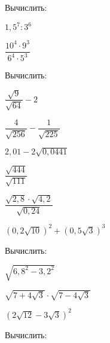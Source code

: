 %
%	
%
%
\begin{class}[number=7]
	\begin{listofex}
		\item Вычислить:
		\begin{enumcols}[itemcolumns=3]
			\item \( 1,5^7:3^6 \)
			\item \( \dfrac{10^4\cdot9^3}{6^4\cdot5^3} \)
			\item {}
		\end{enumcols}
		\item Вычислить:
		\begin{enumcols}[itemcolumns=3]
			\item \( \dfrac{\sqrt{9}}{\sqrt{64}}-2 \)
			\item \( \dfrac{4}{\sqrt{256}}-\dfrac{1}{\sqrt{225}} \)
			\item \( 2,01-2\sqrt{0,0441} \)
			\item \( \dfrac{\sqrt{444}}{\sqrt{111}} \)
			\item \( \dfrac{\sqrt{2,8}\cdot\sqrt{4,2}}{\sqrt{0,24}} \)
			\item \( (0,2\sqrt{10})^2+(0,5\sqrt{3})^3 \)
		\end{enumcols}
		\item Вычислить:
		\begin{enumcols}[itemcolumns=3]
			\item \( \sqrt{6,8^2-3,2^2} \)
			\item \( \sqrt{7+4\sqrt{3}}\cdot\sqrt{7-4\sqrt{3}} \)
			\item \( (2\sqrt{12}-3\sqrt{3})^2 \)
		\end{enumcols}
		\item Вычислить:
		\begin{enumcols}[itemcolumns=2]
			\item {}
			\item {}
			\item {}
		\end{enumcols}
		\item {}
		\item {}
		\item {}

\end{listofex}
\end{class}
